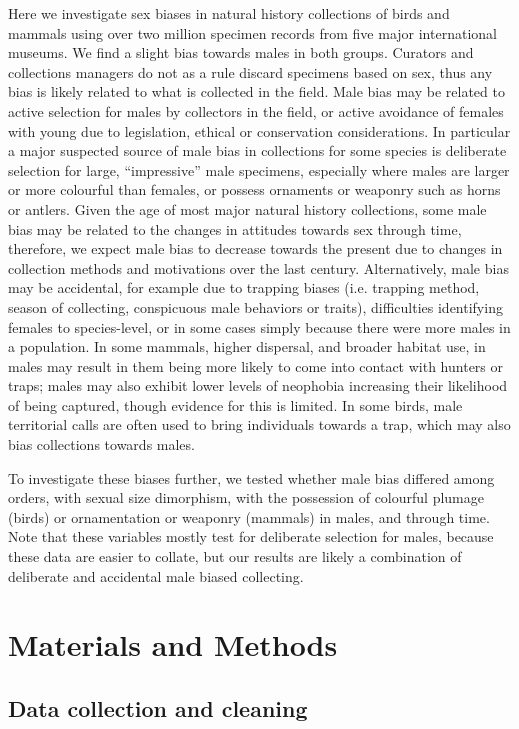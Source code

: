 \documentclass[a4paper, 12pt]{article}
\begin{document}
Here we investigate sex biases in natural history collections of birds and mammals using over two million specimen records from five major international museums.
We find a slight bias towards males in both groups.
Curators and collections managers do not as a rule discard specimens based on sex, thus any bias is likely related to what is collected in the field. 
Male bias may be related to active selection for males by collectors in the field, or active avoidance of females with young due to legislation, ethical or conservation considerations. 
In particular a major suspected source of male bias in collections for some species is deliberate selection for large, ``impressive'' male specimens, especially where males are larger or more colourful than females, or possess ornaments or weaponry such as horns or antlers.
Given the age of most major natural history collections, some male bias may be related to the changes in attitudes towards sex through time, therefore, we expect male bias to decrease towards the present due to changes in collection methods and motivations over the last century. 
Alternatively, male bias may be accidental, for example due to trapping biases (i.e. trapping method, season of collecting, conspicuous male behaviors or traits), difficulties identifying females to species-level, or in some cases simply because there were more males in a population. 
In some mammals, higher dispersal, and broader habitat use, in males may result in them being more likely to come into contact with hunters or traps; males may also exhibit lower levels of neophobia increasing their likelihood of being captured, though evidence for this is limited\cite{crane2017patterns,laviola1992sexual}. 
In some birds, male territorial calls are often used to bring individuals towards a trap, which may also bias collections towards males.

To investigate these biases further, we tested whether male bias differed among orders, with sexual size dimorphism, with the possession of colourful plumage (birds) or ornamentation or weaponry (mammals) in males, and through time. 
Note that these variables mostly test for deliberate selection for males, because these data are easier to collate, but our results are likely a combination of deliberate and accidental male biased collecting.

\section{Materials and Methods}
\subsection{Data collection and cleaning}
\end{document}
